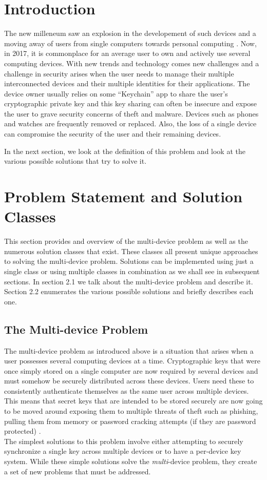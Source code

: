 \section{Introduction}

The new milleneum saw an explosion in the developement of such devices and a moving away of users from single computers towards personal computing \cite{Lyle2013}. Now, in 2017, it is commonplace for an average user to own and actively use several computing devices. With new trends and technology comes new challenges and a challenge in security arises when the user needs to manage their multiple interconnected devices and their multiple identities for their applications. The device owner usually relies on some ``Keychain'' app to share the user's cryptographic private key and this key sharing can often be insecure and expose the user to grave security concerns of theft and malware\cite{Atwater2016}. Devices such as phones and watches are frequently removed or replaced. Also, the loss of a single device can compromise the security of the user and their remaining devices.

In the next section, we look at the definition of this problem and look at the various possible solutions that try to solve it.

\section{Problem Statement and Solution Classes}
This section provides and overview of the multi-device problem as well as the numerous solution classes that exist. These classes all present unique approaches to solving the multi-device problem. Solutions can be implemented using just a single class or using multiple classes in combination as we shall see in subsequent sections.
In section 2.1 we talk about the multi-device problem and describe it. Section 2.2 enumerates the various possible solutions and briefly describes each one.

\subsection{The Multi-device Problem}
The multi-device problem as introduced above is a situation that arises when a user possesses several computing devices at a time. Cryptographic keys that were once simply stored on a single computer are now required by several devices and must somehow be securely distributed across these devices. Users need these to consistently authenticate themselves as the same user across multiple devices. This means that secret keys that are intended to be stored securely are now going to be moved around exposing them to multiple threats of theft such as phishing, pulling them from memory or password cracking attempts (if they are password protected) \cite{Atwater2016}.\\
The simplest solutions to this problem involve either attempting to securely synchronize a single key across multiple devices or to have a per-device key system. While these simple solutions solve the \emph{multi}-device problem, they create a set of new problems that must be addressed\cite{Atwater2016}.

